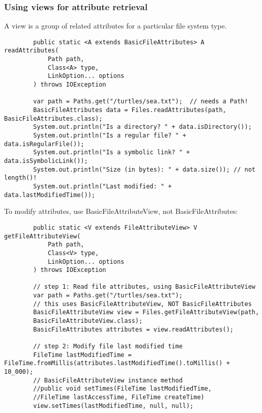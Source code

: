 \documentclass{scrartcl}
\begin{document}
\subsubsection{Using views for attribute retrieval}

    A view is a group of related attributes for a particular file system type.

    \begin{lstlisting}
        public static <A extends BasicFileAttributes> A readAttributes(
            Path path,
            Class<A> type,
            LinkOption... options
        ) throws IOException

        var path = Paths.get("/turtles/sea.txt");  // needs a Path!
        BasicFileAttributes data = Files.readAttributes(path, BasicFileAttributes.class);
        System.out.println("Is a directory? " + data.isDirectory());
        System.out.println("Is a regular file? " + data.isRegularFile());
        System.out.println("Is a symbolic link? " + data.isSymbolicLink());
        System.out.println("Size (in bytes): " + data.size()); // not length()!
        System.out.println("Last modified: " + data.lastModifiedTime());
    \end{lstlisting}

    To modify attributes, use BasicFileAttributeView, not BasicFileAttributes:

    \begin{lstlisting}
        public static <V extends FileAttributeView> V getFileAttributeView(
            Path path,
            Class<V> type,
            LinkOption... options
        ) throws IOException

        // step 1: Read file attributes, using BasicFileAttributeView
        var path = Paths.get("/turtles/sea.txt");
        // this uses BasicFileAttributeView, NOT BasicFileAttributes
        BasicFileAttributeView view = Files.getFileAttributeView(path,
        BasicFileAttributeView.class);
        BasicFileAttributes attributes = view.readAttributes();

        // step 2: Modify file last modified time
        FileTime lastModifiedTime = FileTime.fromMillis(attributes.lastModifiedTime().toMillis() + 10_000);
        // BasicFileAttributeView instance method
        //public void setTimes(FileTime lastModifiedTime,
        //FileTime lastAccessTime, FileTime createTime)
        view.setTimes(lastModifiedTime, null, null);
    \end{lstlisting}
\end{document}
